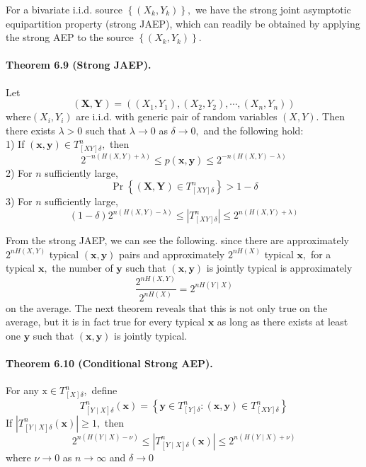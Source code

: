 \documentclass[8pt]{article}
\begin{document}
For a bivariate i.i.d. source $\left\{\left(X_{k}, Y_{k}\right)\right\},$ we have the strong joint asymptotic equipartition property (strong JAEP), which can readily be obtained by applying the strong AEP to the source $\left\{\left(X_{k}, Y_{k}\right)\right\}$.
\begin{tcolorbox}
\paragraph{Theorem 6.9 (Strong JAEP).} Let
$$
(\mathbf{X}, \mathbf{Y})=\left(\left(X_{1}, Y_{1}\right),\left(X_{2}, Y_{2}\right), \cdots,\left(X_{n}, Y_{n}\right)\right)
$$
where$\left(X_{i}, Y_{i}\right)$ are i.i.d. with generic pair of random variables $(X, Y) .$ Then there exists $\lambda>0$ such that $\lambda \rightarrow 0$ as $\delta \rightarrow 0,$ and the following hold:\\
1) If $(\mathbf{x}, \mathbf{y}) \in T_{[X Y] \delta}^{n},$ then
$$
2^{-n(H(X, Y)+\lambda)} \leq p(\mathbf{x}, \mathbf{y}) \leq 2^{-n(H(X, Y)-\lambda)}
$$
2) For $n$ sufficiently large,
$$
\operatorname{Pr}\left\{(\mathbf{X}, \mathbf{Y}) \in T_{[X Y] \delta}^{n}\right\}>1-\delta
$$
3) For $n$ sufficiently large,
$$
(1-\delta) 2^{n(H(X, Y)-\lambda)} \leq\left|T_{[X Y] \delta}^{n}\right| \leq 2^{n(H(X, Y)+\lambda)}
$$
\end{tcolorbox}
From the strong JAEP, we can see the following. since there are approximately $2^{n H(X, Y)}$ typical $(\mathbf{x}, \mathbf{y})$ pairs and approximately $2^{n H(X)}$ typical $\mathbf{x},$ for a typical $\mathbf{x},$ the number of $\mathbf{y}$ such that $(\mathbf{x}, \mathbf{y})$ is jointly typical is approximately
$$
\frac{2^{n H(X, Y)}}{2^{n H(X)}}=2^{n H(Y \mid X)}
$$
on the average. The next theorem reveals that this is not only true on the average, but it is in fact true for every typical $\mathbf{x}$ as long as there exists at least one $\mathbf{y}$ such that $(\mathbf{x}, \mathbf{y})$ is jointly typical.
\begin{tcolorbox}
\paragraph{Theorem 6.10 (Conditional Strong AEP).} For any $\mathrm{x} \in T_{[X] \delta}^{n},$ define
$$
T_{[Y \mid X] \delta}^{n}(\mathbf{x})=\left\{\mathbf{y} \in T_{[Y] \delta}^{n}:(\mathbf{x}, \mathbf{y}) \in T_{[X Y] \delta}^{n}\right\}
$$
If $\left|T_{[Y \mid X] \delta}^{n}(\mathbf{x})\right| \geq 1,$ then
$$
2^{n(H(Y \mid X)-\nu)} \leq\left|T_{[Y \mid X] \delta}^{n}(\mathbf{x})\right| \leq 2^{n(H(Y \mid X)+\nu)}
$$
where $\nu \rightarrow 0$ as $n \rightarrow \infty$ and $\delta \rightarrow 0$
\end{tcolorbox}
\end{document}
